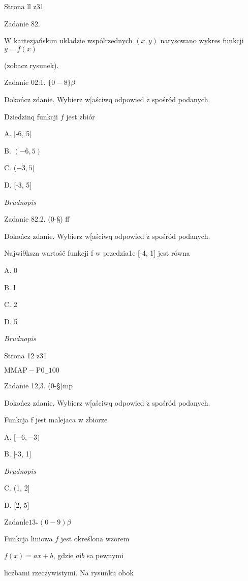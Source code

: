 \documentclass[a4paper,12pt]{article}
\begin{document}
Strona ll z31





Zadanie 82.

$\mathrm{W}$ kartezjańskim ukladzie wspólrzednych $(x,y)$ narysowano wykres funkcji $y=f(x)$

(zobacz rysunek).

Zadanie 02.1. $\{0-8\} \beta$

Dokończ zdanie. Wybierz w[aściwq odpowied $\acute{\mathrm{z}}$ spośród podanych.

Dziedzinq funkcji $f$ jest zbiór

A. [-6, 5]

B. $(-6,5)$

C. $(-3,5]$

D. [-3, 5]

{\it Brudnopis}

Zadanie 82.2. (0-\S) ff

Dokończ zdanie. Wybierz w[aściwq odpowied $\acute{\mathrm{z}}$ spośród podanych.

Najwi9ksza wartośč funkcji f w przedzia1e [-4, 1] jest równa

A. 0

B. l

C. 2

D. 5

{\it Brudnopis}

Strona 12 z31

$\mathrm{M}\mathrm{M}\mathrm{A}\mathrm{P}-\mathrm{P}0_{-}100$





Zädanie 12,3. (0-\S)mp

Dokończ zdanie. Wybierz w[aściwq odpowied $\acute{\mathrm{z}}$ spośród podanych.

Funkcja f jest malejaca w zbiorze

A. $[-6,-3)$

B. [-3, 1]

{\it Brudnopis}

C. (1, 2]

D. [2, 5]

$\mathrm{Z}\mathrm{a}\mathrm{d}\mathrm{a}\mathrm{n}\dot{\mathrm{l}}\mathrm{e}13_{*}(0-9) \beta$

Funkcja liniowa $f$ jest określona wzorem

$f(x)=ax+b$, gdzie $a \mathrm{i} b$ sa pewnymi

liczbami rzeczywistymi. Na rysunku obok
\end{document}
